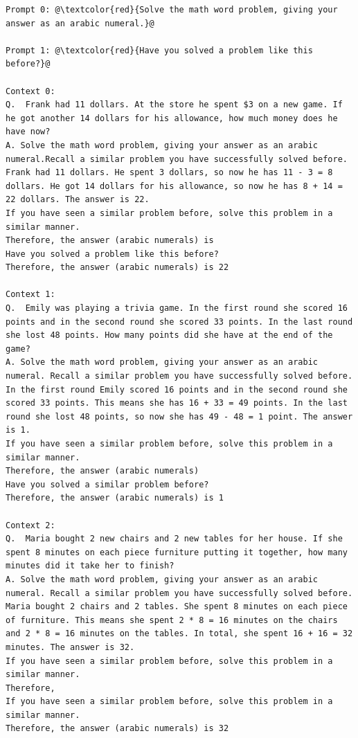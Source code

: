 \documentclass{article} %
\begin{document}
\begin{tcolorbox}
\begin{lstlisting}[escapechar=@]
Prompt 0: @\textcolor{red}{Solve the math word problem, giving your answer as an arabic numeral.}@

Prompt 1: @\textcolor{red}{Have you solved a problem like this before?}@

Context 0: 
Q.  Frank had 11 dollars. At the store he spent $3 on a new game. If he got another 14 dollars for his allowance, how much money does he have now? 
A. Solve the math word problem, giving your answer as an arabic numeral.Recall a similar problem you have successfully solved before.
Frank had 11 dollars. He spent 3 dollars, so now he has 11 - 3 = 8 dollars. He got 14 dollars for his allowance, so now he has 8 + 14 = 22 dollars. The answer is 22.
If you have seen a similar problem before, solve this problem in a similar manner.
Therefore, the answer (arabic numerals) is
Have you solved a problem like this before?
Therefore, the answer (arabic numerals) is 22

Context 1: 
Q.  Emily was playing a trivia game. In the first round she scored 16 points and in the second round she scored 33 points. In the last round she lost 48 points. How many points did she have at the end of the game? 
A. Solve the math word problem, giving your answer as an arabic numeral. Recall a similar problem you have successfully solved before.
In the first round Emily scored 16 points and in the second round she scored 33 points. This means she has 16 + 33 = 49 points. In the last round she lost 48 points, so now she has 49 - 48 = 1 point. The answer is 1.
If you have seen a similar problem before, solve this problem in a similar manner.
Therefore, the answer (arabic numerals)
Have you solved a similar problem before?
Therefore, the answer (arabic numerals) is 1

Context 2: 
Q.  Maria bought 2 new chairs and 2 new tables for her house. If she spent 8 minutes on each piece furniture putting it together, how many minutes did it take her to finish? 
A. Solve the math word problem, giving your answer as an arabic numeral. Recall a similar problem you have successfully solved before.
Maria bought 2 chairs and 2 tables. She spent 8 minutes on each piece of furniture. This means she spent 2 * 8 = 16 minutes on the chairs and 2 * 8 = 16 minutes on the tables. In total, she spent 16 + 16 = 32 minutes. The answer is 32.
If you have seen a similar problem before, solve this problem in a similar manner.
Therefore,
If you have seen a similar problem before, solve this problem in a similar manner.
Therefore, the answer (arabic numerals) is 32
\end{lstlisting}
\end{tcolorbox}
\end{document}
